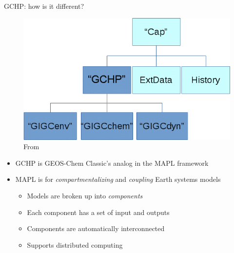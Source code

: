 \documentclass[10pt]{beamer}
\begin{document}
\begin{frame}{GCHP: how is it different?}
    \begin{minipage}[c]{0.39\textwidth}
        \begin{figure}
            \centering
            \includegraphics[width=\textwidth]{gchp_components.png}
            \captionsetup{labelformat=empty}
            \caption{From \cite{geos-chem_developers_developing_2019}}
        \end{figure}
    \end{minipage}
    \begin{minipage}[c]{0.6\textwidth}
        \begin{itemize}
            \item GCHP is GEOS-Chem Classic's analog in the MAPL framework
            \vspace{3mm}
            \item MAPL is for \textit{compartmentalizing} and \textit{coupling} Earth systems models 
            \vspace{3mm}
            \begin{itemize}
                \item Models are broken up into \textit{components}
                \vspace{3mm}
                \item Each component has a set of input and outputs
                \vspace{3mm}
                \item Components are automatically interconnected
                \vspace{3mm}
                \item Supports distributed computing
            \end{itemize}
        \end{itemize}
    \end{minipage}
\end{frame}
\end{document}
